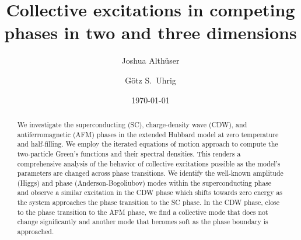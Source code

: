 \documentclass[
    reprint, 
    aps,
    preprintnumbers,
    twocolumn,
    prb,
    superscriptaddress
]{revtex4-2}
\begin{document}
 

\title{Collective excitations in competing phases in two and three dimensions}


\author{Joshua Alth\"user}

\author{G\"otz S.~Uhrig}

\date{\today}

\begin{abstract}
    We investigate the superconducting (SC), charge-density wave (CDW), and antiferromagnetic (AFM) phases 
    in the extended Hubbard model at zero temperature and half-filling.
    We employ the iterated equations of motion approach \cite{Kalthoff17,bleicker18} to compute the two-particle Green's functions and their spectral densities.
    This renders a comprehensive analysis of the behavior of collective excitations possible as the model's parameters are changed across phase transitions.
    We identify the well-known amplitude (Higgs) and phase (Anderson-Bogoliubov) modes within the superconducting phase and observe a similar excitation in the CDW phase which shifts towards zero energy as the system approaches the phase transition to the SC phase.
    In the CDW phase, close to the phase transition to the AFM phase, we find a collective mode that does not change significantly and another mode that becomes soft as the phase boundary is approached.
\end{abstract}

\maketitle
\end{document}
